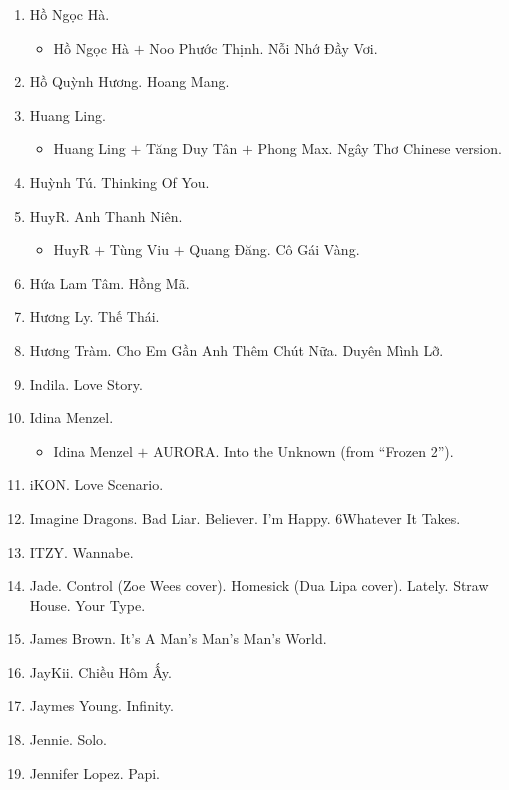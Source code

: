 \documentclass{article}
\begin{document}
\begin{enumerate}
\begin{quotation}
		Good God, let me give you my life
	\end{quotation}
	\item {\sc Hồ Ngọc Hà.}
	\begin{itemize}
		\item {\sc Hồ Ngọc Hà $+$ Noo Phước Thịnh.} Nỗi Nhớ Đầy Vơi.
	\end{itemize}
	\item {\sc Hồ Quỳnh Hương.} Hoang Mang.
	\item {\sc Huang Ling.}
	\begin{itemize}
		\item {\sc Huang Ling $+$ Tăng Duy Tân $+$ Phong Max.} Ngây Thơ Chinese version.
	\end{itemize}
	\item {\sc Huỳnh Tú.} Thinking Of You.
	\item {\sc HuyR.} Anh Thanh Niên.
	\begin{itemize}
		\item {\sc HuyR $+$ Tùng Viu $+$ Quang Đăng.} Cô Gái Vàng.
	\end{itemize}
	\item {\sc Hứa Lam Tâm.} Hồng Mã.
	\item {\sc Hương Ly.} Thế Thái.
	\item {\sc Hương Tràm.} Cho Em Gần Anh Thêm Chút Nữa. Duyên Mình Lỡ.
	\item {\sc Indila.} Love Story.
	\item {\sc Idina Menzel.}
	\begin{itemize}
		\item {\sc Idina Menzel $+$ AURORA.} Into the Unknown (from ``Frozen 2'').
	\end{itemize}
	\item {\sc iKON.} Love Scenario.
	\item {\sc Imagine Dragons.} Bad Liar. Believer. I'm Happy. 6Whatever It Takes.
	\item {\sc ITZY.} Wannabe.
	\item {\sc Jade.} Control (Zoe Wees cover). Homesick (Dua Lipa cover). Lately. Straw House. Your Type.
	\item {\sc James Brown.} It's A Man's Man's Man's World.
	\item {\sc JayKii.} Chiều Hôm Ấy.
	\item {\sc Jaymes Young.} Infinity.
	\item {\sc Jennie.} Solo.
	\item {\sc Jennifer Lopez.} Papi.
	\begin{itemize}

\end{itemize}
\end{enumerate}
\end{document}

